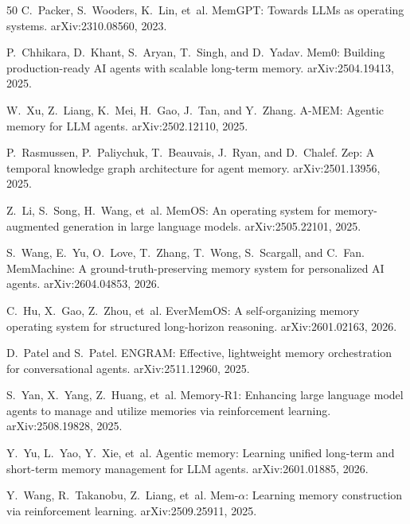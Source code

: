 \documentclass[11pt]{article}
\begin{document}
\begin{thebibliography}{50}
C.~Packer, S.~Wooders, K.~Lin, et~al.
\newblock MemGPT: Towards LLMs as operating systems.
\newblock arXiv:2310.08560, 2023.

P.~Chhikara, D.~Khant, S.~Aryan, T.~Singh, and D.~Yadav.
\newblock Mem0: Building production-ready AI agents with scalable long-term memory.
\newblock arXiv:2504.19413, 2025.

W.~Xu, Z.~Liang, K.~Mei, H.~Gao, J.~Tan, and Y.~Zhang.
\newblock A-MEM: Agentic memory for LLM agents.
\newblock arXiv:2502.12110, 2025.

P.~Rasmussen, P.~Paliychuk, T.~Beauvais, J.~Ryan, and D.~Chalef.
\newblock Zep: A temporal knowledge graph architecture for agent memory.
\newblock arXiv:2501.13956, 2025.

Z.~Li, S.~Song, H.~Wang, et~al.
\newblock MemOS: An operating system for memory-augmented generation in large language models.
\newblock arXiv:2505.22101, 2025.

S.~Wang, E.~Yu, O.~Love, T.~Zhang, T.~Wong, S.~Scargall, and C.~Fan.
\newblock MemMachine: A ground-truth-preserving memory system for personalized AI agents.
\newblock arXiv:2604.04853, 2026.

C.~Hu, X.~Gao, Z.~Zhou, et~al.
\newblock EverMemOS: A self-organizing memory operating system for structured long-horizon reasoning.
\newblock arXiv:2601.02163, 2026.

D.~Patel and S.~Patel.
\newblock ENGRAM: Effective, lightweight memory orchestration for conversational agents.
\newblock arXiv:2511.12960, 2025.

S.~Yan, X.~Yang, Z.~Huang, et~al.
\newblock Memory-R1: Enhancing large language model agents to manage and utilize memories via reinforcement learning.
\newblock arXiv:2508.19828, 2025.

Y.~Yu, L.~Yao, Y.~Xie, et~al.
\newblock Agentic memory: Learning unified long-term and short-term memory management for LLM agents.
\newblock arXiv:2601.01885, 2026.

Y.~Wang, R.~Takanobu, Z.~Liang, et~al.
\newblock Mem-$\alpha$: Learning memory construction via reinforcement learning.
\newblock arXiv:2509.25911, 2025.


\end{thebibliography}
\end{document}

